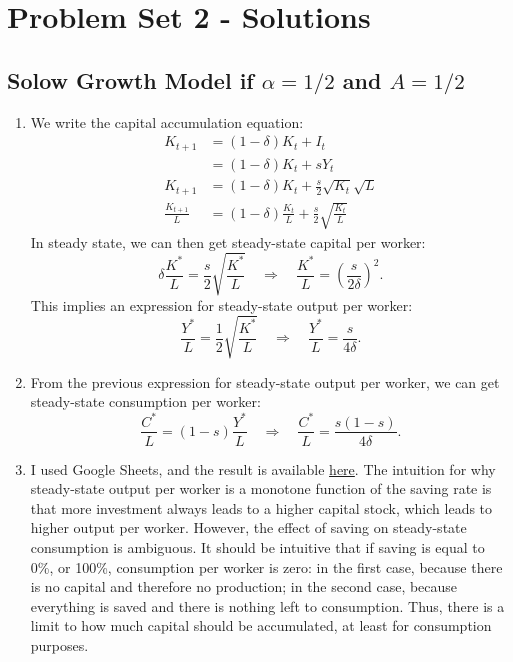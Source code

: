 \documentclass[]{book}
\theoremstyle{definition}
\theoremstyle{definition}
\theoremstyle{definition}
\theoremstyle{remark}
\begin{document}
\chapter*{Problem Set 2 - Solutions}\label{problem-set-2---solutions}

\section*{\texorpdfstring{Solow Growth Model if \(\alpha = 1/2\) and
\(A=1/2\)}{Solow Growth Model if \textbackslash{}alpha = 1/2 and A=1/2}}\label{solow-growth-model-if-alpha-12-and-a12-1}

\begin{enumerate}
\def\labelenumi{\arabic{enumi}.}
\item
  We write the capital accumulation equation: \[\begin{aligned}
  K_{t+1}&=(1-\delta)K_{t}+I_{t}\\
  &=(1-\delta)K_{t}+sY_{t}\\
  K_{t+1} &=(1-\delta)K_{t}+\frac{s}{2}\sqrt{K_{t}}\sqrt{L}\\
  \frac{K_{t+1}}{L}&=(1-\delta)\frac{K_{t}}{L}+\frac{s}{2}\sqrt{\frac{K_{t}}{L}}
  \end{aligned}\] In steady state, we can then get steady-state capital
  per worker:
  \[\delta\frac{K^{*}}{L}=\frac{s}{2}\sqrt{\frac{K^{*}}{L}}\quad\Rightarrow\quad\boxed{\frac{K^{*}}{L}=\left(\frac{s}{2\delta}\right)^{2}}.\]
  This implies an expression for steady-state output per worker:
  \[\frac{Y^{*}}{L}=\frac{1}{2}\sqrt{\frac{K^{*}}{L}} \quad \Rightarrow \quad \boxed{\frac{Y^{*}}{L}=\frac{s}{4\delta}}.\]
\item
  From the previous expression for steady-state output per worker, we
  can get steady-state consumption per worker:
  \[\frac{C^{*}}{L}=(1-s)\frac{Y^{*}}{L}\quad\Rightarrow\quad\boxed{\frac{C^{*}}{L}=\frac{s(1-s)}{4\delta}}.\]
\item
  I used Google Sheets, and the result is available
  \href{https://docs.google.com/spreadsheets/d/1dkygwhDNT79cU_mTVXWal4RyGwX38OTnu5iS5UTz1fc/edit?usp=sharing}{here}.
  The intuition for why steady-state output per worker is a monotone
  function of the saving rate is that more investment always leads to a
  higher capital stock, which leads to higher output per worker.
  However, the effect of saving on steady-state consumption is
  ambiguous. It should be intuitive that if saving is equal to 0\%, or
  100\%, consumption per worker is zero: in the first case, because
  there is no capital and therefore no production; in the second case,
  because everything is saved and there is nothing left to consumption.
  Thus, there is a limit to how much capital should be accumulated, at
  least for consumption purposes.
\end{enumerate}
\end{document}
